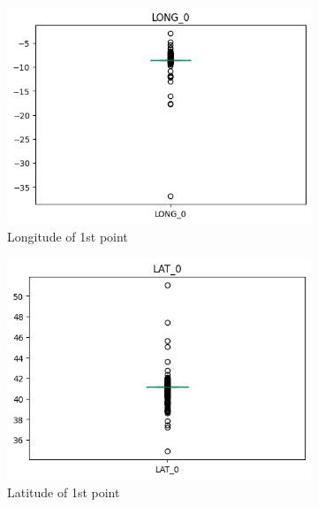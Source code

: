 \documentclass[12pt, titlepage]{article}
\begin{document}
\begin{figure}[H]
    \centering
    \begin{subfigure}[t]{.49\textwidth}
        \includegraphics[width =\textwidth]{image/long0_train.png}
        \caption{Longitude of 1st point}
        \label{fig:long_lat}
    \end{subfigure}
    \hfill
    \begin{subfigure}[t]{.49\textwidth}
        \includegraphics[width =\textwidth]{image/lat0_train.png}
        \caption{Latitude of 1st point}
        \label{fig:long_lat}
    \end{subfigure}
    \hfill
    \begin{subfigure}[t]{.49\textwidth}

\end{subfigure}
\end{figure}
\end{document}
